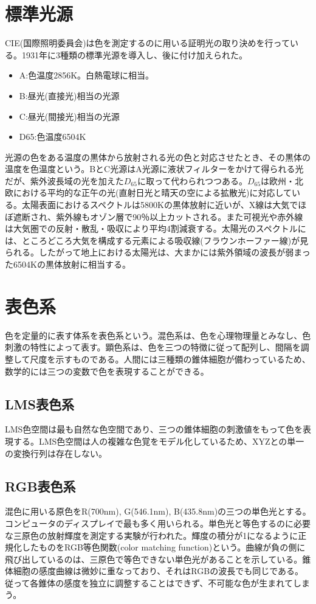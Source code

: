	\section{標準光源}
		CIE(国際照明委員会)は色を測定するのに用いる証明光の取り決めを行っている。1931年に3種類の標準光源を導入し、後に付け加えられた。
		\begin{itemize}
			\item A:色温度2856K。白熱電球に相当。
			\item B:昼光(直接光)相当の光源
			\item C:昼光(間接光)相当の光源
			\item D65:色温度6504K
		\end{itemize}
		光源の色をある温度の黒体から放射される光の色と対応させたとき、その黒体の温度を色温度という。BとC光源はA光源に液状フィルターをかけて得られる光だが、紫外波長域の光を加えた$D_{65}$に取って代わられつつある。$D_{65}$は欧州・北欧における平均的な正午の光(直射日光と晴天の空による拡散光)に対応している。太陽表面におけるスペクトルは5800Kの黒体放射に近いが、X線は大気でほぼ遮断され、紫外線もオゾン層で90％以上カットされる。また可視光や赤外線は大気圏での反射・散乱・吸収により平均4割減衰する。太陽光のスペクトルには、ところどころ大気を構成する元素による吸収線(フラウンホーファー線)が見られる。したがって地上における太陽光は、大まかには紫外領域の波長が弱まった6504Kの黒体放射に相当する。
	\section{表色系}
		色を定量的に表す体系を表色系という。混色系は、色を心理物理量とみなし、色刺激の特性によって表す。顕色系は、色を三つの特徴に従って配列し、間隔を調整して尺度を示すものである。人間には三種類の錐体細胞が備わっているため、数学的には三つの変数で色を表現することができる。
		\subsection{LMS表色系}
			LMS色空間は最も自然な色空間であり、三つの錐体細胞の刺激値をもって色を表現する。LMS色空間は人の複雑な色覚をモデル化しているため、XYZとの単一の変換行列は存在しない。
		\subsection{RGB表色系}
			混色に用いる原色をR(700nm), G(546.1nm), B(435.8nm)の三つの単色光とする。コンピュータのディスプレイで最も多く用いられる。単色光と等色するのに必要な三原色の放射輝度を測定する実験が行われた。輝度の積分が1になるように正規化したものをRGB等色関数(color matching function)という。曲線が負の側に飛び出しているのは、三原色で等色できない単色光があることを示している。錐体細胞の感度曲線は微妙に重なっており、それはRGBの波長でも同じである。従って各錐体の感度を独立に調整することはできず、不可能な色が生まれてしまう。
